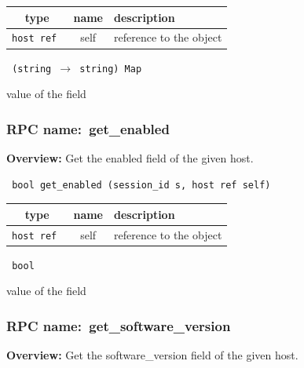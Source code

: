  
\vspace{0.3cm}
\begin{tabular}{|c|c|p{7cm}|}
 \hline
{\bf type} & {\bf name} & {\bf description} \\ \hline
{\tt host ref } & self & reference to the object \\ \hline 

\end{tabular}

\vspace{0.3cm}

{\tt 
(string $\rightarrow$ string) Map
}


value of the field
\vspace{0.3cm}
\vspace{0.3cm}
\vspace{0.3cm}
\subsubsection{RPC name:~get\_enabled}

{\bf Overview:} 
Get the enabled field of the given host.

\begin{verbatim} bool get_enabled (session_id s, host ref self)\end{verbatim}



 
\vspace{0.3cm}
\begin{tabular}{|c|c|p{7cm}|}
 \hline
{\bf type} & {\bf name} & {\bf description} \\ \hline
{\tt host ref } & self & reference to the object \\ \hline 

\end{tabular}

\vspace{0.3cm}

{\tt 
bool
}


value of the field
\vspace{0.3cm}
\vspace{0.3cm}
\vspace{0.3cm}
\subsubsection{RPC name:~get\_software\_version}

{\bf Overview:} 
Get the software\_version field of the given host.

